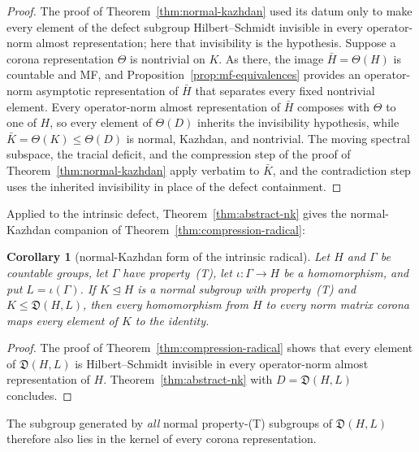 \documentclass[11pt]{amsart}
\newcommand{\leanverified}[2]{\ignorespaces}
\newtheorem{corollary}[theorem]{Corollary}
\theoremstyle{definition}
\theoremstyle{remark}
\theoremstyle{plain}
\begin{document}
\begin{proof}
The proof of Theorem~\ref{thm:normal-kazhdan} used its datum only to
make every element of the defect subgroup Hilbert--Schmidt invisible
in every operator-norm almost representation; here that invisibility
is the hypothesis.  Suppose a corona representation $\Theta$ is
nontrivial on $K$.  As there, the image $\bar H=\Theta(H)$ is
countable and MF, and Proposition~\ref{prop:mf-equivalences} provides
an operator-norm asymptotic representation of $\bar H$ that separates
every fixed nontrivial element.  Every operator-norm almost
representation of $\bar H$ composes with $\Theta$ to one of $H$, so
every element of $\Theta(D)$ inherits the invisibility hypothesis,
while $\bar K=\Theta(K)\le\Theta(D)$ is normal, Kazhdan, and
nontrivial.  The moving spectral subspace, the tracial deficit, and
the compression step of the proof of
Theorem~\ref{thm:normal-kazhdan} apply verbatim to $\bar K$, and the
contradiction step uses the inherited invisibility in place of the
defect containment.
\end{proof}

Applied to the intrinsic defect, Theorem~\ref{thm:abstract-nk} gives
the normal-Kazhdan companion of Theorem~\ref{thm:compression-radical}:

\begin{corollary}[normal-Kazhdan form of the intrinsic radical]\label{cor:intrinsic-nk}
Let $H$ and $\Gamma$ be countable groups, let $\Gamma$ have
property~\textup{(T)}, let $\iota\colon\Gamma\to H$ be a homomorphism,
and put $L=\iota(\Gamma)$.  If $K\trianglelefteq H$ is a normal
subgroup with property~\textup{(T)} and $K\le\mathfrak D(H,L)$, then
every homomorphism from $H$ to every norm matrix corona maps every
element of $K$ to the identity.
\leanverified{Sofic/ManuscriptExactWrappers}{GroupApproximation.ManuscriptExactWrappers.manuscriptIntrinsicNormalKazhdanRadical}
\end{corollary}

\begin{proof}
The proof of Theorem~\ref{thm:compression-radical} shows that every
element of $\mathfrak D(H,L)$ is Hilbert--Schmidt invisible in every
operator-norm almost representation of $H$.
Theorem~\ref{thm:abstract-nk} with $D=\mathfrak D(H,L)$ concludes.
\end{proof}

The subgroup generated by \emph{all} normal property-\textup{(T)}
subgroups of $\mathfrak D(H,L)$ therefore also lies in the kernel of
every corona representation.
\leanverified{Sofic/ManuscriptExactWrappers}{GroupApproximation.ManuscriptExactWrappers.manuscriptIntrinsicNormalKazhdanPart}
\end{document}
